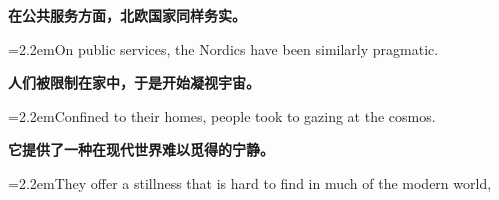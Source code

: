 \documentclass[11pt,a4paper]{article}
\newcommand{\num}[1]{\makebox[1.9em][r]{#1.}\hspace{0.3em}}
\begin{document}
\num{5}\textbf{在公共服务方面，北欧国家同样务实。}

\vspace{0.15em}

\noindent\hangindent=2.2em\hspace{2.2em}On public services, the Nordics have been similarly pragmatic.

\num{6}\textbf{人们被限制在家中，于是开始凝视宇宙。}

\vspace{0.15em}

\noindent\hangindent=2.2em\hspace{2.2em}Confined to their homes, people took to gazing at the cosmos.

\num{7}\textbf{它提供了一种在现代世界难以觅得的宁静。}

\vspace{0.15em}

\noindent\hangindent=2.2em\hspace{2.2em}They offer a stillness that is hard to find in much of the modern world,
\end{document}
